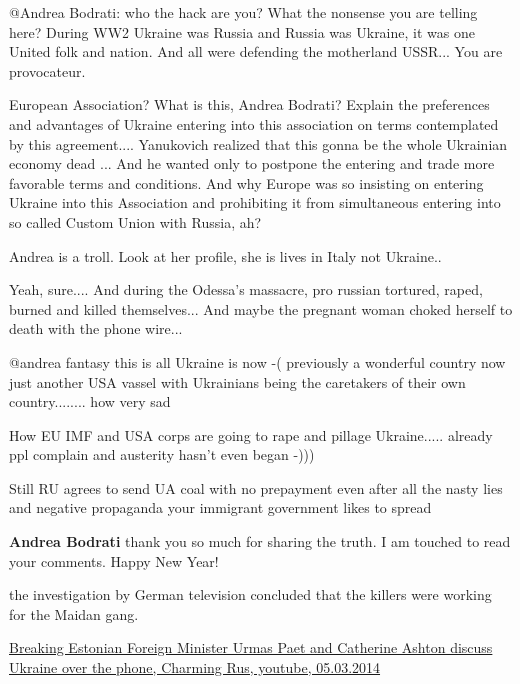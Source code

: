 \begin{itemize}
\begin{itemize}

@Andrea Bodrati: who the hack are you? What the nonsense you are telling here?
During WW2 Ukraine was Russia and Russia was Ukraine, it was one United folk
and nation. And all were defending the motherland USSR... You are provocateur.


European Association? What is this, Andrea Bodrati? Explain the preferences and
advantages of Ukraine entering into this association on terms contemplated by
this agreement.... Yanukovich realized that this gonna be the whole Ukrainian
economy dead ... And he wanted only to postpone the entering and trade more
favorable terms and conditions. And why Europe was so insisting on entering
Ukraine into this Association and prohibiting it from simultaneous entering
into so called Custom Union with Russia, ah?


Andrea is a troll. Look at her profile, she is lives in Italy not Ukraine..

Yeah, sure....
And during the Odessa's massacre, pro russian tortured, raped, burned and killed themselves...
And maybe the pregnant woman choked herself to death with the phone wire...


@andrea fantasy this is all Ukraine is now -( previously a wonderful country
now just another USA vassel with Ukrainians being the caretakers of their own
country........ how very sad


How EU IMF and USA corps are going to rape and pillage Ukraine..... already ppl
complain and austerity hasn't even began -)))

Still RU agrees to send UA coal with no prepayment even after all the nasty
lies and negative propaganda your immigrant government likes to spread

\textbf{Andrea Bodrati} thank you so much for sharing the truth. I am touched to read your comments. Happy New Year!

the investigation by German television concluded that the killers were working for the Maidan gang.


\href{http://youtu.be/g1_vZ8mO0BM}{%
Breaking Estonian Foreign Minister Urmas Paet and Catherine Ashton discuss Ukraine over the phone, %
Charming Rus, youtube, 05.03.2014%
}


\end{itemize}
\end{itemize}
